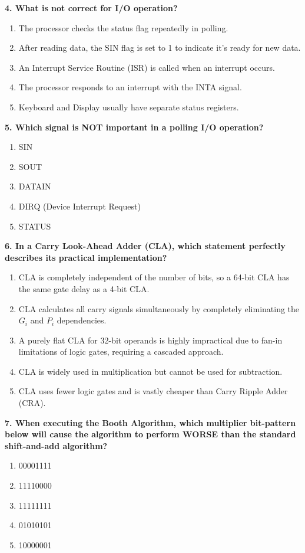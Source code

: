 \documentclass[12pt]{article}
\begin{document}
\textbf{4. What is not correct for I/O operation?}
\begin{enumerate}[label=\Alph*.]
    \item The processor checks the status flag repeatedly in polling.
    \item After reading data, the SIN flag is set to 1 to indicate it's ready for new data.
    \item An Interrupt Service Routine (ISR) is called when an interrupt occurs.
    \item The processor responds to an interrupt with the INTA signal.
    \item Keyboard and Display usually have separate status registers.
\end{enumerate}

\textbf{5. Which signal is NOT important in a polling I/O operation?}
\begin{enumerate}[label=\Alph*.]
    \item SIN
    \item SOUT
    \item DATAIN
    \item DIRQ (Device Interrupt Request)
    \item STATUS
\end{enumerate}

\textbf{6. In a Carry Look-Ahead Adder (CLA), which statement perfectly describes its practical implementation?}
\begin{enumerate}[label=\Alph*.]
    \item CLA is completely independent of the number of bits, so a 64-bit CLA has the same gate delay as a 4-bit CLA.
    \item CLA calculates all carry signals simultaneously by completely eliminating the $G_i$ and $P_i$ dependencies.
    \item A purely flat CLA for 32-bit operands is highly impractical due to fan-in limitations of logic gates, requiring a cascaded approach.
    \item CLA is widely used in multiplication but cannot be used for subtraction.
    \item CLA uses fewer logic gates and is vastly cheaper than Carry Ripple Adder (CRA).
\end{enumerate}

\textbf{7. When executing the Booth Algorithm, which multiplier bit-pattern below will cause the algorithm to perform WORSE than the standard shift-and-add algorithm?}
\begin{enumerate}[label=\Alph*.]
    \item 00001111
    \item 11110000
    \item 11111111
    \item 01010101
    \item 10000001
\end{enumerate}
\end{document}
